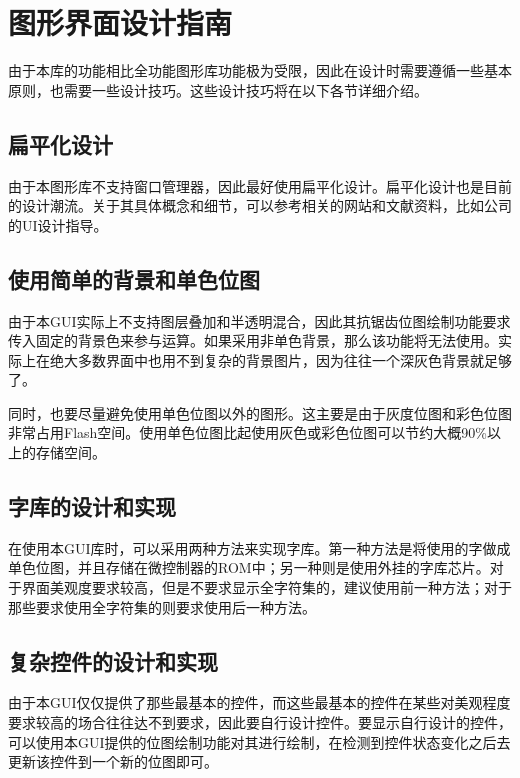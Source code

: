 \section{图形界面设计指南}\label{sec:gui-design-guidelines}

由于本库的功能相比全功能图形库功能极为受限，因此在设计时需要遵循一些基本原则，也需要一些设计技巧。这些设计技巧将在以下各节详细介绍。

\subsection{扁平化设计}\label{subsec:planar-design}

由于本图形库不支持窗口管理器，因此最好使用扁平化设计。扁平化设计也是目前的设计潮流。关于其具体概念和细节，可以参考相关的网站和文献资料，比如公司的UI设计指导。

\subsection{使用简单的背景和单色位图}\label{subsec:use-a-simple-background-and-monochrome-bitmaps}

由于本GUI实际上不支持图层叠加和半透明混合，因此其抗锯齿位图绘制功能要求传入固定的背景色来参与运算。如果采用非单色背景，那么该功能将无法使用。实际上在绝大多数界面中也用不到复杂的背景图片，因为往往一个深灰色背景就足够了。

同时，也要尽量避免使用单色位图以外的图形。这主要是由于灰度位图和彩色位图非常占用Flash空间。使用单色位图比起使用灰色或彩色位图可以节约大概90\%以上的存储空间。

\subsection{字库的设计和实现}\label{subsec:font-library-design-and-implementation}

在使用本GUI库时，可以采用两种方法来实现字库。第一种方法是将使用的字做成单色位图，并且存储在微控制器的ROM中；另一种则是使用外挂的字库芯片。对于界面美观度要求较高，但是不要求显示全字符集的，建议使用前一种方法；对于那些要求使用全字符集的则要求使用后一种方法。

\subsection{复杂控件的设计和实现}\label{subsec:design-and-implementation-of-complex-controls}

由于本GUI仅仅提供了那些最基本的控件，而这些最基本的控件在某些对美观程度要求较高的场合往往达不到要求，因此要自行设计控件。要显示自行设计的控件，可以使用本GUI提供的位图绘制功能对其进行绘制，在检测到控件状态变化之后去更新该控件到一个新的位图即可。

